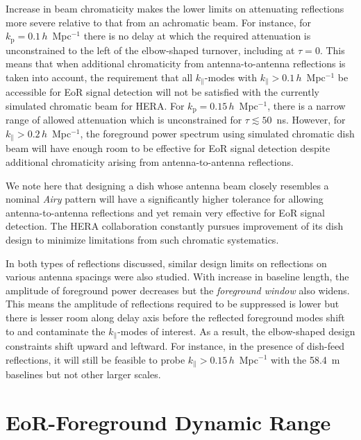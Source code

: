 \documentclass[preprint2,iop,numberedappendix,twocolappendix,appendixfloats]{emulateapj}
\begin{document}
Increase in beam chromaticity makes the lower limits on attenuating reflections more severe relative to that from an achromatic beam. For instance, for $k_\textrm{p}=0.1\,h$~Mpc$^{-1}$ there is no delay at which the required attenuation is unconstrained to the left of the elbow-shaped turnover, including at $\tau=0$. This means that when additional chromaticity from antenna-to-antenna reflections is taken into account, the requirement that all $k_\parallel$-modes with $k_\parallel > 0.1\,h$~Mpc$^{-1}$ be accessible for EoR signal detection will not be satisfied with the currently simulated chromatic beam for HERA. For $k_\textrm{p}=0.15\,h$~Mpc$^{-1}$, there is a narrow range of allowed attenuation which is unconstrained for $\tau \lesssim 50$~ns. However, for $k_\parallel > 0.2\,h$~Mpc$^{-1}$, the foreground power spectrum using simulated chromatic dish beam will have enough room to be effective for EoR signal detection despite additional chromaticity arising from antenna-to-antenna reflections. 

We note here that designing a dish whose antenna beam closely resembles a nominal {\it Airy} pattern will have a significantly higher tolerance for allowing antenna-to-antenna reflections and yet remain very effective for EoR signal detection. The HERA collaboration constantly pursues improvement of its dish design to minimize limitations from such chromatic systematics.

In both types of reflections discussed, similar design limits on reflections on various antenna spacings were also studied. With increase in baseline length, the amplitude of foreground power decreases but the {\it foreground window} also widens. This means the amplitude of reflections required to be suppressed is lower but there is lesser room along delay axis before the reflected foreground modes shift to and contaminate the $k_\parallel$-modes of interest. As a result, the elbow-shaped design constraints shift upward and leftward. For instance, in the presence of dish-feed reflections, it will still be feasible to probe $k_\parallel > 0.15\,h$~Mpc$^{-1}$ with the 58.4~m baselines but not other larger scales.

\section{EoR-Foreground Dynamic Range}\label{sec:eor-sensitivity}
\end{document}
